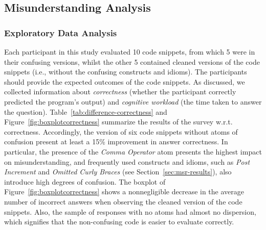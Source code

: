 \subsection{Misunderstanding Analysis}

\subsubsection*{Exploratory Data Analysis}

Each participant in this study evaluated 10 code snippets, from which 5 were in their confusing versions, whilst the other 5 contained cleaned versions of the code snippets (i.e., without the confusing constructs and idioms). The participants should provide the expected outcomes of the code snippets. As discussed, we collected information about \emph{correctness} (whether the participant correctly predicted the program's output) and \emph{cognitive workload} (the time taken to answer the question). 
Table~\ref{tab:difference-correctness} and Figure~\ref{fig:boxplotcorrectness} summarize the results of the survey w.r.t. correctness. Accordingly, the version of six code snippets without atoms of confusion present at least a 15\% improvement in answer correctness. In particular, the presence of the \emph{Comma Operator} atom presents the highest impact on
misunderstanding, and  
frequently used constructs and idioms, such as \emph{Post Increment} and \emph{Omitted Curly Braces} (see Section~\ref{sec:msr-results}), also introduce high degrees of confusion.
The boxplot of Figure~\ref{fig:boxplotcorrectness} shows a nonnegligible decrease in the average number of incorrect answers when observing the cleaned version of the code snippets. Also, the sample of responses with no atoms had almost no dispersion, which signifies that the non-confusing code is easier to evaluate correctly. 



